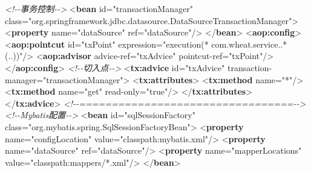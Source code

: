 \documentclass[
]{article}
\newenvironment{Shaded}{}{}
\newcommand{\CommentTok}[1]{\textcolor[rgb]{0.38,0.63,0.69}{\textit{#1}}}
\newcommand{\KeywordTok}[1]{\textcolor[rgb]{0.00,0.44,0.13}{\textbf{#1}}}
\newcommand{\NormalTok}[1]{#1}
\newcommand{\OtherTok}[1]{\textcolor[rgb]{0.00,0.44,0.13}{#1}}
\newcommand{\StringTok}[1]{\textcolor[rgb]{0.25,0.44,0.63}{#1}}
\begin{document}
\begin{Shaded}
\begin{Highlighting}[]
    \CommentTok{\textless{}!{-}{-}事务控制{-}{-}\textgreater{}}
\NormalTok{    \textless{}}\KeywordTok{bean}\OtherTok{ id=}\StringTok{"transactionManager"}\OtherTok{ class=}\StringTok{"org.springframework.jdbc.datasource.DataSourceTransactionManager"}\NormalTok{\textgreater{}}
\NormalTok{        \textless{}}\KeywordTok{property}\OtherTok{ name=}\StringTok{"dataSource"}\OtherTok{ ref=}\StringTok{"dataSource"}\NormalTok{/\textgreater{}}
\NormalTok{    \textless{}/}\KeywordTok{bean}\NormalTok{\textgreater{}}
\NormalTok{    \textless{}}\KeywordTok{aop:config}\NormalTok{\textgreater{}}
\NormalTok{        \textless{}}\KeywordTok{aop:pointcut}\OtherTok{ id=}\StringTok{"txPoint"}\OtherTok{ expression=}\StringTok{"execution(* com.wheat.service..*(..))"}\NormalTok{/\textgreater{}}
\NormalTok{        \textless{}}\KeywordTok{aop:advisor}\OtherTok{ advice{-}ref=}\StringTok{"txAdvice"}\OtherTok{ pointcut{-}ref=}\StringTok{"txPoint"}\NormalTok{/\textgreater{}}
\NormalTok{    \textless{}/}\KeywordTok{aop:config}\NormalTok{\textgreater{}}
    \CommentTok{\textless{}!{-}{-}切入点{-}{-}\textgreater{}}
\NormalTok{    \textless{}}\KeywordTok{tx:advice}\OtherTok{ id=}\StringTok{"txAdvice"}\OtherTok{ transaction{-}manager=}\StringTok{"transactionManager"}\NormalTok{\textgreater{}}
\NormalTok{        \textless{}}\KeywordTok{tx:attributes}\NormalTok{\textgreater{}}
\NormalTok{            \textless{}}\KeywordTok{tx:method}\OtherTok{ name=}\StringTok{"*"}\NormalTok{/\textgreater{}}
\NormalTok{            \textless{}}\KeywordTok{tx:method}\OtherTok{ name=}\StringTok{"get"}\OtherTok{ read{-}only=}\StringTok{"true"}\NormalTok{/\textgreater{}}
\NormalTok{        \textless{}/}\KeywordTok{tx:attributes}\NormalTok{\textgreater{}}
\NormalTok{    \textless{}/}\KeywordTok{tx:advice}\NormalTok{\textgreater{}}
    \CommentTok{\textless{}!{-}{-}================================={-}{-}\textgreater{}}
    \CommentTok{\textless{}!{-}{-}Mybatis配置{-}{-}\textgreater{}}
\NormalTok{    \textless{}}\KeywordTok{bean}\OtherTok{ id=}\StringTok{"sqlSessionFactory"}\OtherTok{ class=}\StringTok{"org.mybatis.spring.SqlSessionFactoryBean"}\NormalTok{\textgreater{}}
\NormalTok{        \textless{}}\KeywordTok{property}\OtherTok{ name=}\StringTok{"configLocation"}\OtherTok{ value=}\StringTok{"classpath:mybatis.xml"}\NormalTok{/\textgreater{}}
\NormalTok{        \textless{}}\KeywordTok{property}\OtherTok{ name=}\StringTok{"dataSource"}\OtherTok{ ref=}\StringTok{"dataSource"}\NormalTok{/\textgreater{}}
\NormalTok{        \textless{}}\KeywordTok{property}\OtherTok{ name=}\StringTok{"mapperLocations"}\OtherTok{ value=}\StringTok{"classpath:mappers/*.xml"}\NormalTok{/\textgreater{}}
\NormalTok{    \textless{}/}\KeywordTok{bean}\NormalTok{\textgreater{}}


\end{Highlighting}
\end{Shaded}
\end{document}
